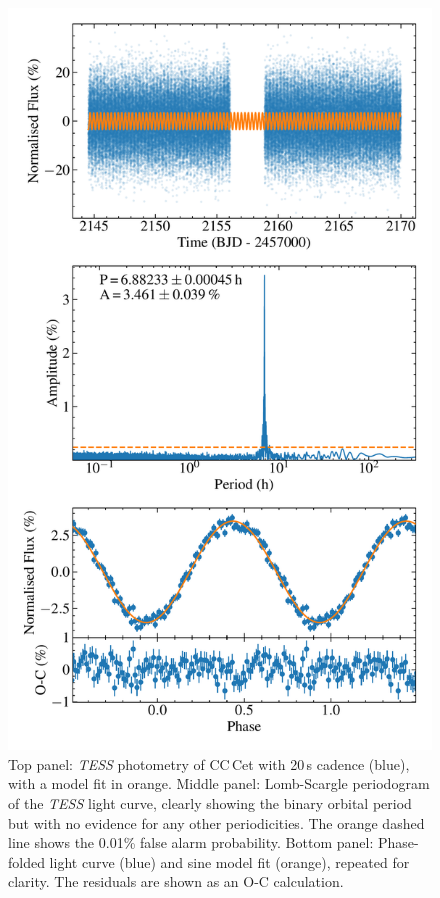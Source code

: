 \documentclass[fleqn,usenatbib]{mnras}
\begin{document}
\begin{figure}
    \centering
    \includegraphics[width=\columnwidth]{cc_cet_tess_20s.pdf}
    \caption{Top panel: \textit{TESS} photometry of CC\,Cet with 20\,s cadence (blue), with a model fit in orange. Middle panel: Lomb-Scargle periodogram of the \textit{TESS} light curve, clearly showing the binary orbital period but with no evidence for any other periodicities. The orange dashed line shows the 0.01\% false alarm probability. Bottom panel: Phase-folded light curve (blue) and sine model fit (orange), repeated for clarity. The residuals are shown as an O-C calculation.}  
    \label{fig:tess}
\end{figure}
\end{document}
